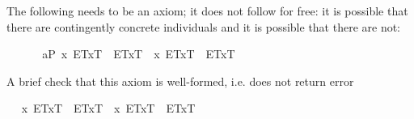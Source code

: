 \begin{isabellebody}
\begin{isamarkuptext}
The following needs to be an axiom; it does not follow for free: it is possible that there 
  are contingently concrete individuals and it is possible that there are not:%
\end{isamarkuptext}%
\isamarkuptrue%
\ \isamarkupfalse%
\ \isanewline
\ \ \ a{}{}{\isacharunderscore}{}{\isacharunderscore}P{\isacharcolon}\ {\isachardoublequoteopen}{\isacharbrackleft}\isactrlbold {\isasymdiamond}{\isacharparenleft}\isactrlbold {\isasymexists}x{\isachardot}\ {\isasymlparr}E\isactrlsup T{\isacharcomma}x\isactrlsup T{\isasymrparr}\ \isactrlbold {\isasymand}\ \isactrlbold {\isasymdiamond}{\isacharparenleft}\isactrlbold {\isasymnot}{\isasymlparr}E\isactrlsup T{\isacharcomma}x\isactrlsup T{\isasymrparr}{\isacharparenright}{\isacharparenright}\ \isactrlbold {\isasymand}\ \isactrlbold {\isasymdiamond}{\isacharparenleft}\isactrlbold {\isasymnot}{\isacharparenleft}\isactrlbold {\isasymexists}x{\isachardot}\ {\isasymlparr}E\isactrlsup T{\isacharcomma}x\isactrlsup T{\isasymrparr}\ \isactrlbold {\isasymand}\ \isactrlbold {\isasymdiamond}{\isacharparenleft}\isactrlbold {\isasymnot}{\isasymlparr}E\isactrlsup T{\isacharcomma}x\isactrlsup T{\isasymrparr}{\isacharparenright}{\isacharparenright}{\isacharparenright}{\isacharbrackright}\ {\isacharequal}\ {\isasymtop}{\isachardoublequoteclose}%
\begin{isamarkuptext}%
A brief check that this axiom is well-formed, i.e. does not return error%
\end{isamarkuptext}%
\isamarkuptrue%
\ \isamarkupfalse%
\ {\isachardoublequoteopen}{\isacharbrackleft}\isactrlbold {\isasymdiamond}{\isacharparenleft}\isactrlbold {\isasymexists}x{\isachardot}\ {\isasymlparr}E\isactrlsup T{\isacharcomma}x\isactrlsup T{\isasymrparr}\ \isactrlbold {\isasymand}\ \isactrlbold {\isasymdiamond}{\isacharparenleft}\isactrlbold {\isasymnot}{\isasymlparr}E\isactrlsup T{\isacharcomma}x\isactrlsup T{\isasymrparr}{\isacharparenright}{\isacharparenright}\ \isactrlbold {\isasymand}\ \isactrlbold {\isasymdiamond}{\isacharparenleft}\isactrlbold {\isasymnot}{\isacharparenleft}\isactrlbold {\isasymexists}x{\isachardot}\ {\isasymlparr}E\isactrlsup T{\isacharcomma}x\isactrlsup T{\isasymrparr}\ \isactrlbold {\isasymand}\ \isactrlbold {\isasymdiamond}{\isacharparenleft}\isactrlbold {\isasymnot}{\isasymlparr}E\isactrlsup T{\isacharcomma}x\isactrlsup T{\isasymrparr}{\isacharparenright}{\isacharparenright}{\isacharparenright}{\isacharbrackright}\ {\isasymnoteq}\ {\isacharasterisk}{\isachardoublequoteclose}%

\end{isabellebody}
